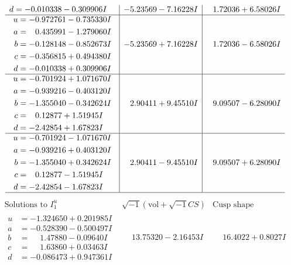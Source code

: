 \documentclass[1p]{elsarticle_modified}
\theoremstyle{definition}
\newcommand{\I}{\sqrt{-1}}
\begin{document}
$$\begin{array}{c|c|c}
\begin{aligned}
d &= -0.010338 - 0.309906 I\end{aligned}
 & -5.23569 - 7.16228 I & \phantom{-}1.72036 + 6.58026 I \\ \hline\begin{aligned}
u &= -0.972761 - 0.735330 I \\
a &= \phantom{-}0.435991 - 1.279060 I \\
b &= -0.128148 - 0.852673 I \\
c &= -0.356815 + 0.494380 I \\
d &= -0.010338 + 0.309906 I\end{aligned}
 & -5.23569 + 7.16228 I & \phantom{-}1.72036 - 6.58026 I \\ \hline\begin{aligned}
u &= -0.701924 + 1.071670 I \\
a &= -0.939216 - 0.403120 I \\
b &= -1.355040 - 0.342624 I \\
c &= \phantom{-}0.12877 + 1.51945 I \\
d &= -2.42854 + 1.67823 I\end{aligned}
 & \phantom{-}2.90411 + 9.45510 I & \phantom{-}9.09507 - 6.28090 I \\ \hline\begin{aligned}
u &= -0.701924 - 1.071670 I \\
a &= -0.939216 + 0.403120 I \\
b &= -1.355040 + 0.342624 I \\
c &= \phantom{-}0.12877 - 1.51945 I \\
d &= -2.42854 - 1.67823 I\end{aligned}
 & \phantom{-}2.90411 - 9.45510 I & \phantom{-}9.09507 + 6.28090 I\\
 \hline 
 \end{array}$$\newpage$$\begin{array}{c|c|c}  
\text{Solutions to }I^u_{1}& \I (\text{vol} + \sqrt{-1}CS) & \text{Cusp shape}\\
 \hline 
\begin{aligned}
u &= -1.324650 + 0.201985 I \\
a &= -0.528390 - 0.500497 I \\
b &= \phantom{-}1.47880 - 0.09640 I \\
c &= \phantom{-}1.63860 + 0.03463 I \\
d &= -0.086473 + 0.947361 I\end{aligned}
 & \phantom{-}13.75320 - 2.16453 I & \phantom{-}16.4022 + 0.8027 I \\ \hline\begin{aligned}

\end{aligned}
\end{array}$$
\end{document}
